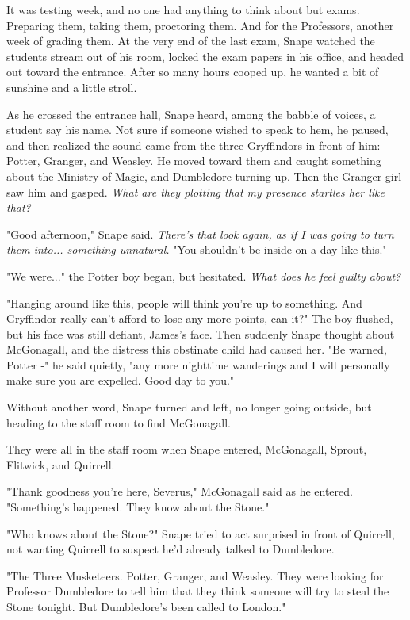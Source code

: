 \sbreak

It was testing week, and no one had anything to think about but exams. Preparing them, taking them, proctoring them. And for the Professors, another week of grading them. At the very end of the last exam, Snape watched the students stream out of his room, locked the exam papers in his office, and headed out toward the entrance. After so many hours cooped up, he wanted a bit of sunshine and a little stroll.

As he crossed the entrance hall, Snape heard, among the babble of voices, a student say his name. Not sure if someone wished to speak to hem, he paused, and then realized the sound came from the three Gryffindors in front of him: Potter, Granger, and Weasley. He moved toward them and caught something about the Ministry of Magic, and Dumbledore turning up. Then the Granger girl saw him and gasped. \emph{What are they plotting that my presence startles her like that?}

"Good afternoon," Snape said. \emph{There's that look again, as if I was going to turn them into... something unnatural.} "You shouldn't be inside on a day like this."

"We were..." the Potter boy began, but hesitated. \emph{What does he feel guilty about?}

"Hanging around like this, people will think you're up to something. And Gryffindor really can't afford to lose any more points, can it?" The boy flushed, but his face was still defiant, James's face. Then suddenly Snape thought about McGonagall, and the distress this obstinate child had caused her. "Be warned, Potter -" he said quietly, "any more nighttime wanderings and I will personally make sure you are expelled. Good day to you."

Without another word, Snape turned and left, no longer going outside, but heading to the staff room to find McGonagall.

They were all in the staff room when Snape entered, McGonagall, Sprout, Flitwick, and Quirrell.

"Thank goodness you're here, Severus," McGonagall said as he entered. "Something's happened. They know about the Stone."

"Who knows about the Stone?" Snape tried to act surprised in front of Quirrell, not wanting Quirrell to suspect he'd already talked to Dumbledore.

"The Three Musketeers. Potter, Granger, and Weasley. They were looking for Professor Dumbledore to tell him that they think someone will try to steal the Stone tonight. But Dumbledore's been called to London."

